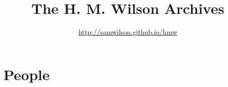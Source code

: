 \documentclass[a4paper, twoside]{book}
\title{The H. M. Wilson Archives}
\author{\url{http://samwilson.github.io/hmw}}
\begin{document}
\maketitle
\tableofcontents

\chapter{People}






%

\printindex
\end{document}
